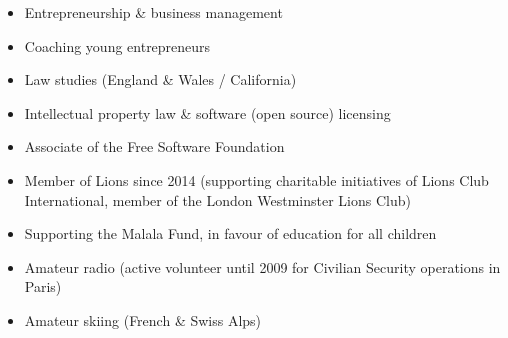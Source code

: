 


\divider


\divider


\divider


\divider


\medskip


\begin{itemize}
\item Entrepreneurship \& business management
\item Coaching young entrepreneurs
\item Law studies (England \& Wales / California)
\item Intellectual property law \& software (open source)
licensing
\item Associate of the Free Software Foundation
\item Member of Lions since 2014 (supporting charitable
initiatives of Lions Club International, member of the
London Westminster Lions Club)
\item Supporting the Malala Fund, in favour of education
for all children
\item Amateur radio (active volunteer until 2009 for
Civilian Security operations in Paris)
\item Amateur skiing (French \& Swiss Alps)
\end{itemize}




